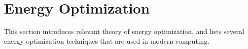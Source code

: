 %
%
%



\section{Energy Optimization}
This section introduces relevant theory of energy optimization, and lists several energy optimization techniques that are used in modern computing.

